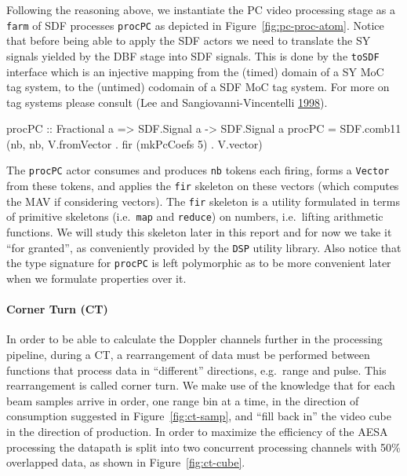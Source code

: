 \documentclass[
  a4paper,
]{article}
\newenvironment{Shaded}{}{}
\newcommand{\DataTypeTok}[1]{\textcolor[rgb]{0.56,0.13,0.00}{#1}}
\newcommand{\DecValTok}[1]{\textcolor[rgb]{0.25,0.63,0.44}{#1}}
\newcommand{\FunctionTok}[1]{\textcolor[rgb]{0.02,0.16,0.49}{#1}}
\newcommand{\NormalTok}[1]{#1}
\newcommand{\OtherTok}[1]{\textcolor[rgb]{0.00,0.44,0.13}{#1}}
\let\oldparagraph\paragraph
\renewcommand{\paragraph}[1]{\oldparagraph{#1}\mbox{}}
\begin{document}
Following the reasoning above, we instantiate the PC video processing
stage as a \texttt{farm} of SDF processes \texttt{procPC} as depicted in
Figure~\ref{fig:pc-proc-atom}. Notice that before being able to apply
the SDF actors we need to translate the SY signals yielded by the DBF
stage into SDF signals. This is done by the \texttt{toSDF} interface
which is an injective mapping from the (timed) domain of a SY MoC tag
system, to the (untimed) codomain of a SDF MoC tag system. For more on
tag systems please consult (Lee and Sangiovanni-Vincentelli
\protect\hyperlink{ref-lee98}{1998}).

\begin{Shaded}
\begin{Highlighting}[numbers=left,,firstnumber=233,]
\OtherTok{procPC ::} \DataTypeTok{Fractional}\NormalTok{ a }\OtherTok{=>} \DataTypeTok{SDF.Signal}\NormalTok{ a }\OtherTok{->} \DataTypeTok{SDF.Signal}\NormalTok{ a }
\NormalTok{procPC }\FunctionTok{=}\NormalTok{ SDF.comb11 (nb, nb, V.fromVector }\FunctionTok{.}\NormalTok{ fir (mkPcCoefs }\DecValTok{5}\NormalTok{) }\FunctionTok{.}\NormalTok{ V.vector)}
\end{Highlighting}
\end{Shaded}

The \texttt{procPC} actor consumes and produces \texttt{nb} tokens each
firing, forms a \texttt{Vector} from these tokens, and applies the
\texttt{fir} skeleton on these vectors (which computes the MAV if
considering vectors). The \texttt{fir} skeleton is a utility formulated
in terms of primitive skeletons (i.e.~\texttt{map} and \texttt{reduce})
on numbers, i.e.~lifting arithmetic functions. We will study this
skeleton later in this report and for now we take it ``for granted'', as
conveniently provided by the \texttt{DSP} utility library. Also notice
that the type signature for \texttt{procPC} is left polymorphic as to be
more convenient later when we formulate properties over it.

\hypertarget{sec:ct-atom}{%
\paragraph{Corner Turn (CT)}\label{sec:ct-atom}}

In order to be able to calculate the Doppler channels further in the
processing pipeline, during a CT, a rearrangement of data must be
performed between functions that process data in ``different''
directions, e.g.~range and pulse. This rearrangement is called corner
turn. We make use of the knowledge that for each beam samples arrive in
order, one range bin at a time, in the direction of consumption
suggested in Figure~\ref{fig:ct-samp}, and ``fill back in'' the video
cube in the direction of production. In order to maximize the efficiency
of the AESA processing the datapath is split into two concurrent
processing channels with 50\% overlapped data, as shown in
Figure~\ref{fig:ct-cube}.
\end{document}
